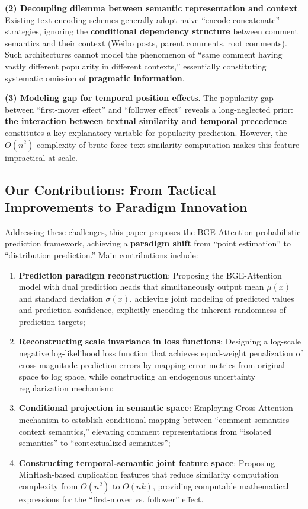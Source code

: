 \documentclass[10pt]{article}
\begin{document}
\textbf{(2) Decoupling dilemma between semantic representation and context}. Existing text encoding schemes generally adopt naive ``encode-concatenate'' strategies, ignoring the \textbf{conditional dependency structure} between comment semantics and their context (Weibo posts, parent comments, root comments). Such architectures cannot model the phenomenon of ``same comment having vastly different popularity in different contexts,'' essentially constituting systematic omission of \textbf{pragmatic information}.

\textbf{(3) Modeling gap for temporal position effects}. The popularity gap between ``first-mover effect'' and ``follower effect'' reveals a long-neglected prior: \textbf{the interaction between textual similarity and temporal precedence} constitutes a key explanatory variable for popularity prediction. However, the $O(n^2)$ complexity of brute-force text similarity computation makes this feature impractical at scale.

\subsection{Our Contributions: From Tactical Improvements to Paradigm Innovation}

Addressing these challenges, this paper proposes the BGE-Attention probabilistic prediction framework, achieving a \textbf{paradigm shift} from ``point estimation'' to ``distribution prediction.'' Main contributions include:

\begin{enumerate}[leftmargin=*]
    \item \textbf{Prediction paradigm reconstruction}: Proposing the BGE-Attention model with dual prediction heads that simultaneously output mean $\mu(x)$ and standard deviation $\sigma(x)$, achieving joint modeling of predicted values and prediction confidence, explicitly encoding the inherent randomness of prediction targets;
    \item \textbf{Reconstructing scale invariance in loss functions}: Designing a log-scale negative log-likelihood loss function that achieves equal-weight penalization of cross-magnitude prediction errors by mapping error metrics from original space to log space, while constructing an endogenous uncertainty regularization mechanism;
    \item \textbf{Conditional projection in semantic space}: Employing Cross-Attention mechanism to establish conditional mapping between ``comment semantics-context semantics,'' elevating comment representations from ``isolated semantics'' to ``contextualized semantics'';
    \item \textbf{Constructing temporal-semantic joint feature space}: Proposing MinHash-based duplication features that reduce similarity computation complexity from $O(n^2)$ to $O(nk)$, providing computable mathematical expressions for the ``first-mover vs. follower'' effect.
\end{enumerate}
\end{document}
